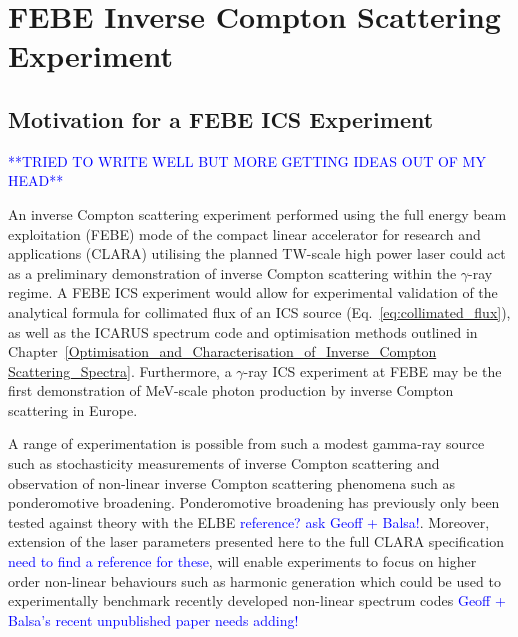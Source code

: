 \documentclass[../main.tex]{subfiles}
\begin{document}
\chapter{FEBE Inverse Compton Scattering Experiment}
\label{FEBE_Inverse_Compton_Scattering_Experiment} %

\section{Motivation for a FEBE ICS Experiment}
\textcolor{blue}{**TRIED TO WRITE WELL BUT MORE GETTING IDEAS OUT OF MY HEAD**}

An inverse Compton scattering experiment performed using the full energy beam exploitation (FEBE) mode of the compact linear accelerator for research and applications (CLARA) utilising the planned \si{\tera\watt}-scale high power laser could act as a preliminary demonstration of inverse Compton scattering within the $\gamma$-ray regime. A FEBE ICS experiment would allow for experimental validation of the analytical formula for collimated flux of an ICS source (Eq.~\ref{eq:collimated_flux}), as well as the \textsc{ICARUS} spectrum code and optimisation methods outlined in Chapter~\ref{Optimisation_and_Characterisation_of_Inverse_Compton Scattering_Spectra}. Furthermore, a $\gamma$-ray ICS experiment at FEBE may be the first demonstration of \si{\mega\electronvolt}-scale photon production by inverse Compton scattering in Europe.

A range of experimentation is possible from such a modest gamma-ray source such as stochasticity measurements of inverse Compton scattering and observation of non-linear inverse Compton scattering phenomena such as ponderomotive broadening. Ponderomotive broadening has previously only been tested against theory \cite{krafft2004spectral} with the ELBE \cite{} \textcolor{blue}{reference? ask Geoff + Balsa!}. Moreover, extension of the laser parameters presented here to the full CLARA specification \cite{} \textcolor{blue}{need to find a reference for these}, will enable experiments to focus on higher order non-linear behaviours such as harmonic generation which could be used to experimentally benchmark recently developed non-linear spectrum codes \cite{terzic2019improving} \textcolor{blue}{Geoff + Balsa's recent unpublished paper needs adding!} 
\end{document}

